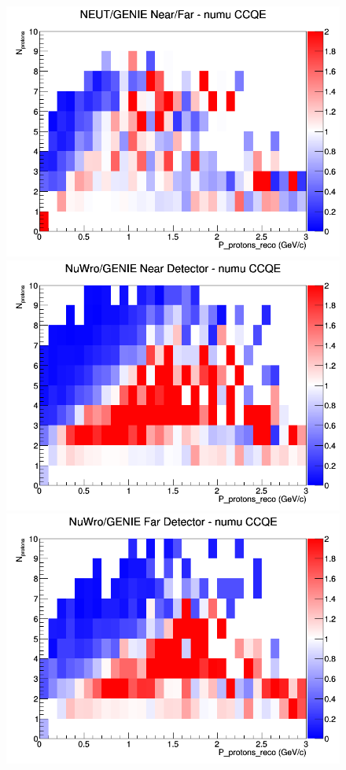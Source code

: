 \documentclass[12pt]{article}
\begin{document}
\begin{figure}[h]
\endminipage
{}
\includegraphics[width=\linewidth]{eff_N_P/GAr/protons/ratios/CCQE_NEUT_GENIE_numu_NF_N_P.png}
\endminipage
\newline
{}
\includegraphics[width=\linewidth]{eff_N_P/GAr/protons/ratios/CCQE_NuWro_GENIE_numu_near_N_P.png}
\endminipage
{}
\includegraphics[width=\linewidth]{eff_N_P/GAr/protons/ratios/CCQE_NuWro_GENIE_numu_far_N_P.png}

\end{figure}
\end{document}
